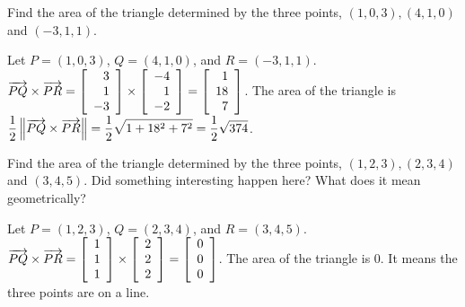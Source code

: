 \documentclass{ximera}
\begin{document}
  \begin{example}
    Find the area of the triangle determined by the three points,
    $(1,0,3),(4,1,0)$ and $(-3,1,1)$.
    \begin{solution}
      Let $P=(1,0,3)$, $Q=(4,1,0)$, and $R=(-3,1,1)$. 
      $\longvect{PQ}\times\longvect{PR}
      = \startmat{r}
        3 \\
        1 \\
        -3
      \stopmat \times \startmat{r}
        -4 \\
        1 \\
        -2
      \stopmat = \startmat{r}
        1 \\
        18 \\
        7
      \stopmat$. The area of the triangle is
      $\displaystyle\frac{1}{2}\norm{\longvect{PQ}\times\longvect{PR}} =
      \frac{1}{2}\sqrt{1+18^2+7^2}=\frac{1}{2}\sqrt{374}$. 
    \end{solution}
  \end{example}
  
  \begin{example}
    Find the area of the triangle determined by the three points,
    $(1,2,3),(2,3,4)$ and $(3,4,5)$. Did something
    interesting happen here? What does it mean geometrically?
    \begin{solution}
      Let $P=(1,2,3)$, $Q=(2,3,4)$, and $R=(3,4,5)$. 
      $\longvect{PQ}\times\longvect{PR}
      = \startmat{r}
        1 \\ 1 \\ 1
      \stopmat \times \startmat{r}
        2 \\ 2 \\ 2
      \stopmat = \startmat{r}
        0 \\ 0 \\ 0
      \stopmat$.
      The area of the triangle is 0. It means the three points are on
      a line.
    \end{solution}
  \end{example}
\end{document}
